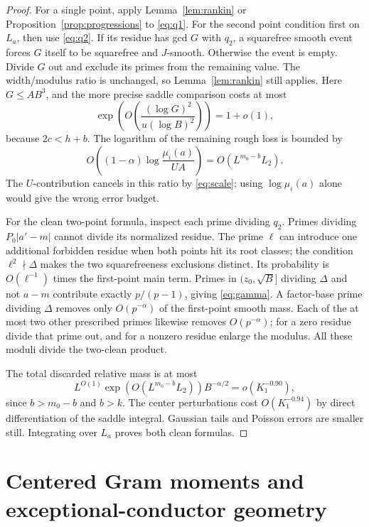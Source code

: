 \begin{proof}
For a single point, apply Lemma~\ref{lem:rankin} or
Proposition~\ref{prop:progressions} to \eqref{eq:q1}.  For the second
point condition first on \(L_a\), then use \eqref{eq:q2}.
If its residue has gcd \(G\) with \(q_2\), a squarefree smooth event
forces \(G\) itself to be squarefree and \(J\)-smooth.  Otherwise
the event is empty.  Divide \(G\) out and exclude its primes from
the remaining value.  The width/modulus ratio is unchanged, so
Lemma~\ref{lem:rankin} still applies.  Here \(G\le AB^3\), and
the more precise saddle comparison costs at most
\[
 \exp\left(O\left(\frac{(\log G)^2}{u(\log B)^2}\right)\right)
 =1+o(1),
\]
because \(2c<h+b\).
The logarithm of the remaining rough loss is bounded by
\[
 O\left((1-\alpha)\log\frac{\mu_i(a)}{UA}\right)
       =O(L^{m_0-b}L_2).
\]
The \(U\)-contribution cancels in this ratio by \eqref{eq:scale};
using \(\log\mu_i(a)\) alone would give the wrong error budget.

For the clean two-point formula, inspect each prime dividing \(q_2\).
Primes dividing \(P_0|a'-m|\) cannot divide its normalized residue.
The prime \(\ell\) can introduce one additional forbidden residue
when both points hit its root classes; the condition
\(\ell^2\nmid\Delta\) makes the two squarefreeness exclusions
distinct.  Its probability is \(O(\ell^{-1})\) times the first-point
main term.  Primes in \((z_0,\sqrt B]\) dividing \(\Delta\) and
not \(a-m\) contribute exactly \(p/(p-1)\), giving
\eqref{eq:gamma}.  A factor-base prime dividing \(\Delta\) removes
only \(O(p^{-\alpha})\) of the first-point smooth mass.  Each of
the at most two other prescribed primes likewise removes
\(O(p^{-\alpha})\); for a zero residue divide that prime out, and
for a nonzero residue enlarge the modulus.  All these moduli divide
the two-clean product.

The total discarded relative mass is at most
\[
 L^{O(1)}\exp(O(L^{m_0-b}L_2))B^{-\alpha/2}
       =o(K_1^{-0.90}),
\]
since \(b>m_0-b\) and \(b>k\).
The center perturbations cost \(O(K_1^{-0.94})\) by direct
differentiation of the saddle integral.  Gaussian tails and Poisson
errors are smaller still.  Integrating over \(L_a\) proves both
clean formulas.
\end{proof}

\section{Centered Gram moments and exceptional-conductor geometry}
\label{sec:moments}

